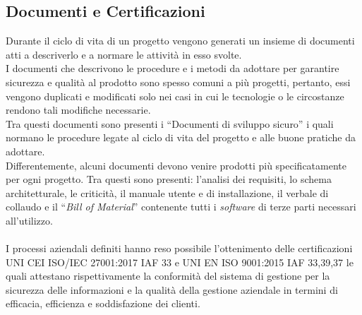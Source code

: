 \subsection{Documenti e Certificazioni}
Durante il ciclo di vita di un progetto vengono generati un insieme di documenti atti a descriverlo e a normare le attività in esso svolte.\\
I documenti che descrivono le procedure e i metodi da adottare per garantire sicurezza e qualità al prodotto sono spesso comuni a più progetti, pertanto, essi vengono duplicati e modificati solo nei casi in cui le tecnologie o le circostanze rendono tali modifiche necessarie.\\
Tra questi documenti sono presenti i “Documenti di sviluppo sicuro” i quali normano le procedure legate al ciclo di vita del progetto e alle buone pratiche da adottare.\\ 
Differentemente, alcuni documenti devono venire prodotti più specificatamente per ogni progetto. Tra questi sono presenti: l'analisi dei requisiti, lo schema architetturale, le criticità, il manuale utente e di installazione, il verbale di collaudo e il “\emph{Bill of Material}” contenente tutti i \emph{software} di terze parti necessari all'utilizzo.\\\\
I processi aziendali definiti hanno reso possibile l'ottenimento delle certificazioni UNI CEI ISO/IEC 27001:2017 IAF 33 e UNI EN ISO 9001:2015 IAF 33,39,37 le quali attestano rispettivamente la conformità del sistema di gestione per la sicurezza delle informazioni e la qualità della gestione aziendale in termini di efficacia, efficienza e soddisfazione dei clienti.\\\\


